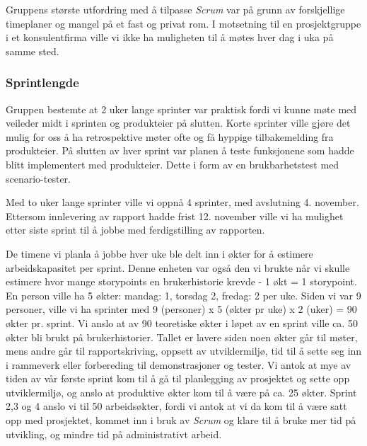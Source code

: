 \documentclass[12pt,a4paper,norsk]{article}
\begin{document}
    \bigskip\begin{adjustwidth}{2.5em}{0pt}
    \end{adjustwidth}
    \bigskip Gruppens største utfordring med å tilpasse \textit{Scrum} var på grunn av forskjellige timeplaner og mangel på et fast og privat rom. I motsetning til en prosjektgruppe i et konsulentfirma ville vi ikke ha muligheten til å møtes hver dag i uka på samme sted.

  \subsubsection{Sprintlengde}
  Gruppen bestemte at 2 uker lange sprinter var praktisk fordi vi kunne møte med veileder midt i sprinten og produkteier på slutten. Korte sprinter ville gjøre det mulig for oss å ha retrospektive møter ofte og få hyppige tilbakemelding fra produkteier. På slutten av hver sprint var planen å teste funksjonene som hadde blitt implementert med produkteier. Dette i form av en brukbarhetstest med scenario-tester.

    Med to uker lange sprinter ville vi oppnå 4 sprinter, med avslutning 4. november. Ettersom innlevering av rapport hadde frist 12. november ville vi ha mulighet etter siste sprint til å jobbe med ferdigstilling av rapporten.

    De timene vi planla å jobbe hver uke ble delt inn i økter for å estimere arbeidskapasitet per sprint. Denne enheten var også den vi brukte når vi skulle estimere hvor mange storypoints en brukerhistorie krevde - 1 økt = 1 storypoint. En person ville ha 5 økter: mandag: 1, torsdag 2, fredag: 2 per uke. Siden vi var 9 personer, ville vi ha sprinter med 9 (personer) x 5 (økter pr uke) x 2 (uker) = 90 økter pr. sprint. Vi anslo at av 90 teoretiske økter i løpet av en sprint ville ca. 50 økter bli brukt på brukerhistorier. Tallet er lavere siden noen økter går til møter, mens andre går til rapportskriving, oppsett av utviklermiljø, tid til å sette seg inn i rammeverk eller forbereding til demonstrasjoner og tester. Vi antok at mye av tiden av vår første sprint kom til å gå til planlegging av prosjektet og sette opp utviklermiljø, og anslo at produktive økter kom til å være på ca. 25 økter. Sprint 2,3 og 4 anslo vi til 50 arbeidsøkter, fordi vi antok at vi da kom til å være satt opp med prosjektet, kommet inn i bruk av \textit{Scrum} og klare til å bruke mer tid på utvikling, og mindre tid på administrativt arbeid.
\end{document}
